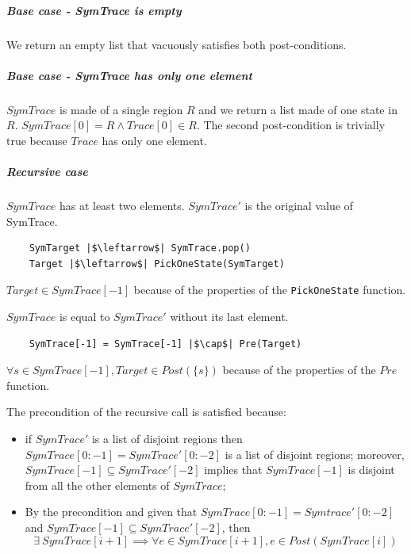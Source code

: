 \documentclass[12pt]{article}
\begin{document}
    \subparagraph*{Base case - SymTrace is empty}
    We return an empty list that vacuously satisfies both post-conditions.

    \subparagraph*{Base case - SymTrace has only one element}

    $SymTrace$ is made of a single region $R$ and we return a list made of one state in $R$.
    $SymTrace[0] = R \wedge Trace[0] \in R$.
    The second post-condition is trivially true because $Trace$ has only one element.

    \subparagraph*{Recursive case}
    $SymTrace$ has at least two elements.
    $SymTrace'$ is the original value of SymTrace.

    \begin{verbatim}
    SymTarget |$\leftarrow$| SymTrace.pop()
    Target |$\leftarrow$| PickOneState(SymTarget)
    \end{verbatim}

    \noindent
    $Target \in SymTrace[-1]$ because of the properties of the \texttt{PickOneState} function.

    \noindent
    $SymTrace$ is equal to $SymTrace'$ without its last element.
     
    \begin{verbatim}
    SymTrace[-1] = SymTrace[-1] |$\cap$| Pre(Target)
    \end{verbatim}

    \noindent
    $\forall s \in SymTrace[-1], Target \in Post(\{s\})$ because of the properties of the $Pre$ function.

    \noindent
    The precondition of the recursive call is satisfied because:
    \begin{itemize}
        \item if $SymTrace'$ is a list of disjoint regions then $SymTrace[0:-1] = SymTrace'[0:-2]$ is a list of disjoint regions;
        moreover, $SymTrace[-1] \subseteq SymTrace'[-2]$ implies that $SymTrace[-1]$ is disjoint from all the other elements of $SymTrace$;
        \item By the precondition and given that $SymTrace[0:-1] = Symtrace'[0:-2]$ and $SymTrace[-1] \subseteq SymTrace'[-2] $, then
        \begin{equation*}
            \exists\ SymTrace[i+1] \implies \forall e \in SymTrace[i+1], e \in Post(SymTrace[i])
        \end{equation*}
    \end{itemize}
\end{document}

